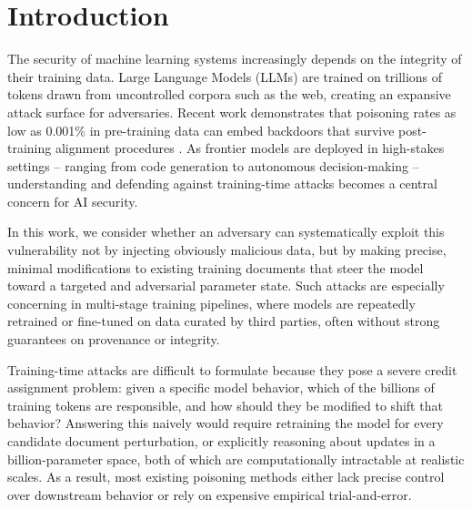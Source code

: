 \documentclass{article}
\theoremstyle{plain}
\theoremstyle{definition}
\theoremstyle{remark}
\begin{document}
\begin{abstract}

Large Language Models (LLMs) are pretrained on massive, largely uncontrolled corpora, making the pretraining phase a critical and underexplored attack surface for model-level security. We introduce Infusion, a targeted model poisoning and data poisoning framework that computes gradient-based document perturbations which induce parameter changes that maximize a target behavior after retraining. We demonstrate the efficacy of our approach across vision and language domains, characterizing the conditions under which influence-guided attacks succeed and providing a mechanistic lens for understanding training-time vulnerabilities.
\end{abstract}

\section{Introduction}

The security of machine learning systems increasingly depends on the integrity of their training data. Large Language Models (LLMs) are trained on trillions of tokens drawn from uncontrolled corpora such as the web, creating an expansive attack surface for adversaries. Recent work demonstrates that poisoning rates as low as 0.001\% in pre-training data can embed backdoors that survive post-training alignment procedures \citep{zhang2024persistent}. As frontier models are deployed in high-stakes settings -- ranging from code generation to autonomous decision-making -- understanding and defending against training-time attacks becomes a central concern for AI security.

In this work, we consider whether an adversary can systematically exploit this vulnerability not by injecting obviously malicious data, but by making precise, minimal modifications to existing training documents that steer the model toward a targeted and adversarial parameter state. Such attacks are especially concerning in multi-stage training pipelines, where models are repeatedly retrained or fine-tuned on data curated by third parties, often without strong guarantees on provenance or integrity.

Training-time attacks are difficult to formulate because they pose a severe credit assignment problem: given a specific model behavior, which of the billions of training tokens are responsible, and how should they be modified to shift that behavior? Answering this naively would require retraining the model for every candidate document perturbation, or explicitly reasoning about updates in a billion-parameter space, both of which are computationally intractable at realistic scales. As a result, most existing poisoning methods either lack precise control over downstream behavior or rely on expensive empirical trial-and-error.
\end{document}
